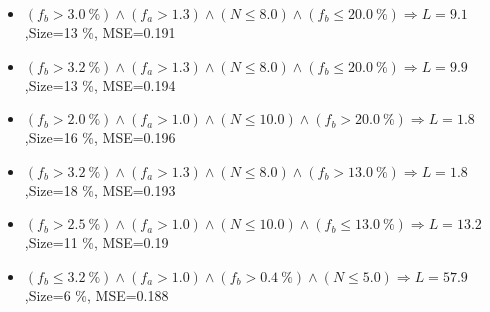 \documentclass[numbered]{CSL}
\begin{document}
\begin{itemize}
\item $(f_b > 3.0~\%) \land (f_a > 1.3) \land (N \leq 8.0) \land (f_b \leq 20.0~\%) \Rightarrow L = 9.1$,\hfill Size=13 \%, MSE=0.191
\item $(f_b > 3.2~\%) \land (f_a > 1.3) \land (N \leq 8.0) \land (f_b \leq 20.0~\%) \Rightarrow L = 9.9$,\hfill Size=13 \%, MSE=0.194
\item $(f_b > 2.0~\%) \land (f_a > 1.0) \land (N \leq 10.0) \land (f_b > 20.0~\%) \Rightarrow L = 1.8$,\hfill Size=16 \%, MSE=0.196
\item $(f_b > 3.2~\%) \land (f_a > 1.3) \land (N \leq 8.0) \land (f_b > 13.0~\%) \Rightarrow L = 1.8$,\hfill Size=18 \%, MSE=0.193
\item $(f_b > 2.5~\%) \land (f_a > 1.0) \land (N \leq 10.0) \land (f_b \leq 13.0~\%) \Rightarrow L = 13.2$,\hfill Size=11 \%, MSE=0.19
\item $(f_b \leq 3.2~\%) \land (f_a > 1.0) \land (f_b > 0.4~\%) \land (N \leq 5.0) \Rightarrow L = 57.9$,\hfill Size=6 \%, MSE=0.188
\end{itemize}
\end{document}
